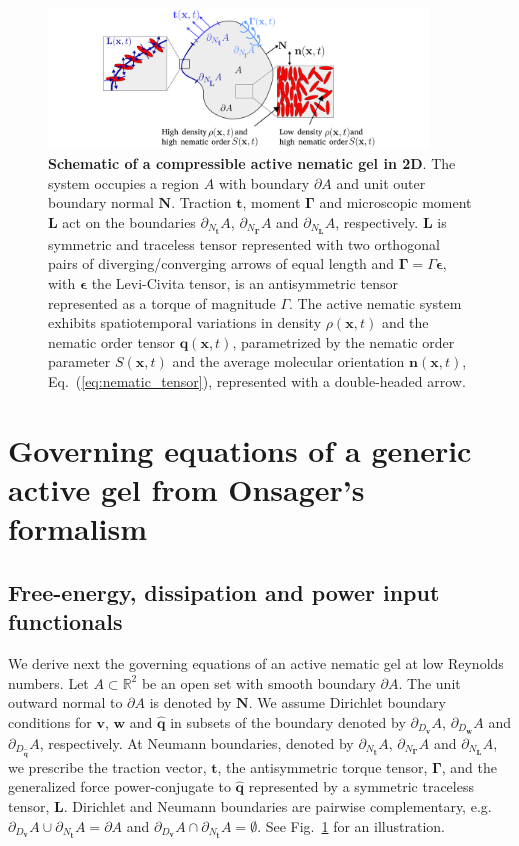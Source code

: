 \documentclass[12pt]{iopart}
\begin{document}
	
	\begin{figure}
		\centering
		\includegraphics[width=0.9\textwidth]{fig0.pdf}
		\caption{\label{fig0}  \textbf{Schematic of a compressible active nematic gel in 2D}. The system occupies a region $A$ with boundary $\partial A$ and unit outer boundary normal $\bm{N}$. Traction $\bm{t}$, moment $\bm{\Gamma}$ and microscopic moment $\bm{L}$ act on the  boundaries $\partial_{N_{\bm{t}}} A $, $\partial_{N_{\bm{\Gamma}}} A $ and $\partial_{N_{\bm{L}}} A $, respectively. $\bm{L}$ is symmetric and traceless tensor represented with two orthogonal pairs of diverging/converging arrows of equal length and $\bm{\Gamma} = \Gamma \bm{\epsilon}$, with $\bm{\epsilon}$ the Levi-Civita tensor, is an antisymmetric tensor represented as a torque of magnitude $\Gamma$.	The active nematic system exhibits spatiotemporal variations in density $\rho(\bm{x},t)$ and the nematic order tensor $\bm{q}(\bm{x},t)$, parametrized by the nematic order parameter $S(\bm{x},t)$ and the average molecular orientation $\bm{n}(\bm{x},t)$, Eq.~(\ref{eq:nematic_tensor}), represented with a double-headed arrow.  	}
	\end{figure}
	
	\section{Governing equations of a generic active gel from Onsager's formalism} \label{sec:Onsager}
	
	\subsection{Free-energy, dissipation and power input functionals}
	
	We derive next the governing equations of an active nematic gel at low Reynolds numbers. Let $A \subset \mathbb{R}^2$ be an open set with smooth boundary $\partial A$. The unit outward normal to $\partial A$ is denoted by $\bm{N}$.  
	We assume Dirichlet boundary conditions for $\bm{v}$, $\bm{w}$ and $\widehat{\bm{q}}$ in  subsets of the boundary denoted by  $\partial_{D_{\bm{v}}} A $, $\partial_{D_{\bm{w}}} A $ and $\partial_{D_{\widehat{\bm{q}}}} A $, respectively.
	At Neumann boundaries, denoted by $\partial_{N_{\bm{t}}} A $, $\partial_{N_{\bm{\Gamma}}} A $ and $\partial_{N_{\bm{L}}} A $, we prescribe the traction vector, $\bm{t}$, the antisymmetric torque tensor, $\bm{\Gamma}$, and the generalized force power-conjugate to $\widehat{\bm{q}}$ represented by a symmetric traceless tensor, $\bm{L}$. Dirichlet and Neumann boundaries are pairwise complementary, e.g.~$\partial_{D_{\bm{v}}} A \cup \partial_{N_{\bm{t}}} A = \partial A$ and $\partial_{D_{\bm{v}}} A \cap \partial_{N_{\bm{t}}} A = \emptyset$. See Fig.~\ref{fig0} for an illustration.
	
\end{document}
